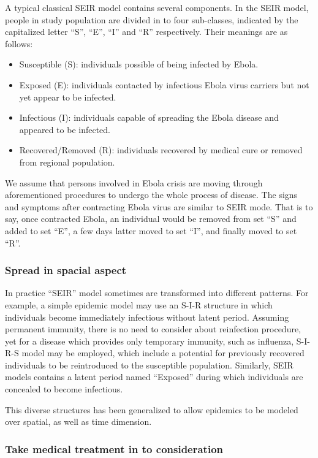 \documentclass[12pt]{article}
\begin{document}
A typical classical SEIR model contains several components. In the SEIR model, people in study population are divided in to four sub-classes, indicated by the capitalized letter ``S'', ``E'', ``I'' and ``R'' respectively. Their meanings are as follows:
\begin{itemize}
\item Susceptible (S): individuals possible of being infected by Ebola.

\item Exposed (E): individuals contacted by infectious Ebola virus carriers but not yet appear to be infected.

\item Infectious (I): individuals capable of spreading the Ebola disease and appeared to be infected.

\item Recovered/Removed (R): individuals recovered by medical cure or removed from regional population.
\end{itemize}
We assume that persons involved in Ebola crisis are moving through aforementioned procedures to undergo the whole process of disease. The signs and symptoms after contracting Ebola virus are similar to SEIR mode. That is to say, once contracted Ebola, an individual would be removed from set ``S'' and added to set ``E'', a few days latter moved to set ``I'', and finally moved to set ``R''.

\subsubsection{Spread in spacial aspect}

In practice ``SEIR'' model sometimes are transformed into different patterns. For example, a simple epidemic model may use an S-I-R structure in which individuals become immediately infectious without latent period.  Assuming permanent immunity, there is no need to consider about reinfection procedure, yet for a disease which provides only temporary immunity, such as influenza, S-I-R-S model may be employed, which include a potential for previously recovered individuals to be reintroduced to the susceptible population. Similarly, SEIR models contains a latent period named ``Exposed'' during which individuals are concealed to become infectious. 

This diverse structures has been generalized to allow epidemics to be modeled over spatial, as well as time dimension.

\subsubsection{Take medical treatment in to consideration}
\end{document}
